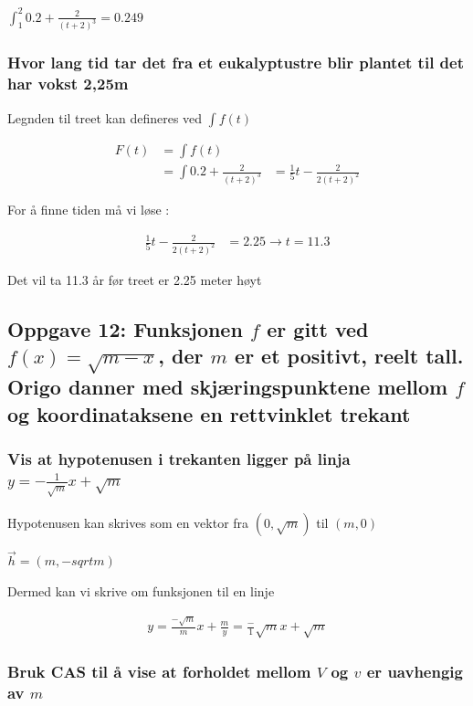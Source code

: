 \documentclass{article}
\begin{document}
$\int_{1}^{2}0.2+\frac{2}{(t+2)^3}=0.249$

\subsubsection{Hvor lang tid tar det fra et eukalyptustre blir plantet til det har vokst 2,25m}

Legnden til treet kan defineres ved $\int f(t)$

\begin{align*}
    F(t) &= \int f(t) \\
    &= \int 0.2+\frac{2}{(t+2)^3}
    &= \frac{1}{5}t - \frac{2}{2(t+2)^2}
\end{align*}

For å finne tiden må vi løse : 

\begin{align*}
    \frac{1}{5}t - \frac{2}{2(t+2)^2} &= 2.25 \rightarrow t = 11.3
\end{align*}

Det vil ta 11.3 år før treet er 2.25 meter høyt

\subsection{Oppgave 12: Funksjonen $f$ er gitt ved $f(x)=\sqrt{m-x}$, der $m$ er et positivt, reelt tall. Origo danner med skjæringspunktene mellom $f$ og koordinataksene en rettvinklet trekant}

\subsubsection{Vis at hypotenusen i trekanten ligger på linja $y=-\frac{1}{\sqrt{m}}x + \sqrt{m}$}

Hypotenusen kan skrives som en vektor fra $(0, \sqrt{m})$ til $(m, 0)$

$\vec{h} = (m, -sqrt{m})$

Dermed kan vi skrive om funksjonen til en linje

\begin{align*}
    y=\frac{-\sqrt{m}}{m}x + \frac{m}
    y=\frac-{1}{\sqrt{m}}x + \sqrt{m}
\end{align*}

\subsubsection{Bruk CAS til å vise at forholdet mellom $V$ og $v$ er uavhengig av $m$}
\end{document}
